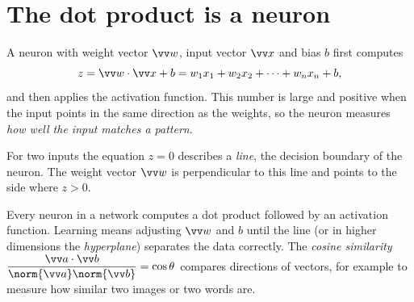 \section*{The dot product is a neuron}
A neuron with weight vector $\vv w$, input vector $\vv x$ and bias $b$ first computes
\[
z=\vv w\cdot\vv x+b=w_1x_1+w_2x_2+\dots+w_nx_n+b,
\]
and then applies the activation function. This number is large and positive when the input points in the same direction as the weights, so the neuron measures \emph{how well the input matches a pattern}.

For two inputs the equation $z=0$ describes a \emph{line}, the decision boundary of the neuron. The weight vector $\vv w$ is perpendicular to this line and points to the side where $z>0$.

\begin{center}

\label{fig:b3_6}
\end{center}

\begin{aibox}
Every neuron in a network computes a dot product followed by an activation function. Learning means adjusting $\vv w$ and $b$ until the line (or in higher dimensions the \emph{hyperplane}) separates the data correctly. The \emph{cosine similarity} $\dfrac{\vv a\cdot\vv b}{\norm{\vv a}\norm{\vv b}}=\cos\theta$ compares directions of vectors, for example to measure how similar two images or two words are.
\end{aibox}

